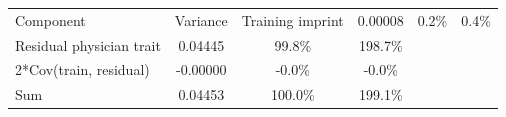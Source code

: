 
\begin{tabular}{lccc}
\toprule
Component & Variance & %
\midrule
Training imprint & 0.00008 & 0.2\% & 0.4\%\\
Residual physician trait & 0.04445 & 99.8\% & 198.7\%\\
2*Cov(train, residual) & -0.00000 & -0.0\% & -0.0\%\\
Sum & 0.04453 & 100.0\% & 199.1\%\\
\bottomrule
\end{tabular}
